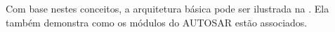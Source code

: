 Com base nestes conceitos, a arquitetura básica pode ser ilustrada na . Ela também demonstra como os módulos do AUTOSAR estão associados.


%
%
%


